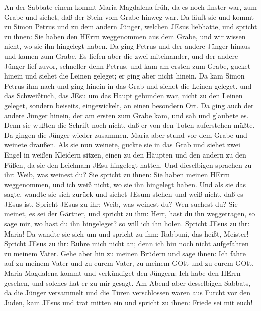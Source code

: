  An der Sabbate einem kommt Maria Magdalena früh, da es noch
finster war, zum Grabe und siehet, daß der Stein vom Grabe hinweg war.
 Da läuft sie und kommt zu Simon Petrus und zu dem andern
Jünger, welchen JEsus liebhatte, und spricht zu ihnen: Sie haben den
HErrn weggenommen aus dem Grabe, und wir wissen nicht, wo sie ihn
hingelegt haben.  Da ging Petrus und der andere Jünger
hinaus und kamen zum Grabe.  Es liefen aber die zwei
miteinander, und der andere Jünger lief zuvor, schneller denn Petrus,
und kam am ersten zum Grabe,  gucket hinein und siehet die
Leinen geleget; er ging aber nicht hinein.  Da kam Simon
Petrus ihm nach und ging hinein in das Grab und siehet die Leinen
geleget.  und das Schweißtuch, das JEsu um das Haupt
gebunden war, nicht zu den Leinen geleget, sondern beiseits,
eingewickelt, an einen besondern Ort.  Da ging auch der
andere Jünger hinein, der am ersten zum Grabe kam, und sah und glaubete
es.  Denn sie wußten die Schrift noch nicht, daß er von den
Toten auferstehen müßte.  Da gingen die Jünger wieder
zusammen.  Maria aber stund vor dem Grabe und weinete
draußen. Als sie nun weinete, guckte sie in das Grab  und
siehet zwei Engel in weißen Kleidern sitzen, einen zu den Häupten und
den andern zu den Füßen, da sie den Leichnam JEsu hingelegt hatten.
 Und dieselbigen sprachen zu ihr: Weib, was weinest du? Sie
spricht zu ihnen: Sie haben meinen HErrn weggenommen, und ich weiß
nicht, wo sie ihn hingelegt haben.  Und als sie das sagte,
wandte sie sich zurück und siehet JEsum stehen und weiß nicht, daß es
JEsus ist.  Spricht JEsus zu ihr: Weib, was weinest du? Wen
suchest du? Sie meinet, es sei der Gärtner, und spricht zu ihm: Herr,
hast du ihn weggetragen, so sage mir, wo hast du ihn hingeleget? so will
ich ihn holen.  Spricht JEsus zu ihr: Maria! Da wandte sie
sich um und spricht zu ihm: Rabbuni, das heißt, Meister! 
Spricht JEsus zu ihr: Rühre mich nicht an; denn ich bin noch nicht
aufgefahren zu meinem Vater. Gehe aber hin zu meinen Brüdern und sage
ihnen: Ich fahre auf zu meinem Vater und zu eurem Vater, zu meinem GOtt
und zu eurem GOtt.  Maria Magdalena kommt und verkündiget
den Jüngern: Ich habe den HErrn gesehen, und solches hat er zu mir
gesagt.  Am Abend aber desselbigen Sabbats, da die Jünger
versammelt und die Türen verschlossen waren aus Furcht vor den Juden,
kam JEsus und trat mitten ein und spricht zu ihnen: Friede sei mit euch!
